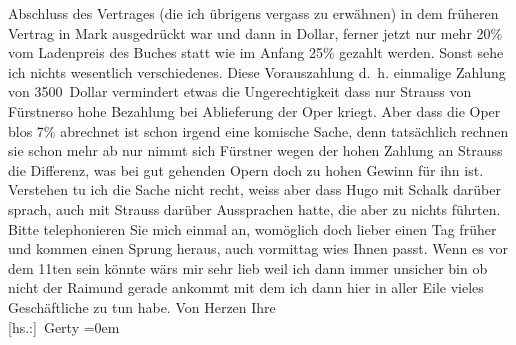 \begin{ledgroupsized}[t]{13cm}
               Abschluss des Vertrages (die ich übrigens vergass zu erwähnen) in dem früheren
               Vertrag in Mark ausgedrückt war und dann in Dollar, ferner jetzt nur mehr 20{\%} vom Ladenpreis des Buches statt wie im Anfang 25{\%} gezahlt werden. Sonst sehe ich nichts wesentlich
               verschiedenes. Diese Vorauszahlung d. h. einmalige Zahlung von 3500 Dollar vermindert
               etwas die Ungerechtigkeit dass nur Strauss von
                  Fürstnerso hohe Bezahlung bei Ablieferung der Oper kriegt.
               Aber dass die Oper blos 7{\%} abrechnet ist schon irgend eine
               komische Sache, denn tatsächlich rechnen sie schon mehr ab nur nimmt sich Fürstner wegen der hohen Zahlung an Strauss die Differenz, was bei gut gehenden
               Opern doch zu hohen Gewinn für ihn ist. Verstehen tu ich die Sache nicht recht, weiss
               aber dass Hugo mit Schalk darüber sprach, auch mit Strauss darüber Aussprachen hatte, die aber zu nichts
               führten.\pend
           \pstart
           Bitte telephonieren Sie mich einmal an, womöglich doch lieber einen Tag früher und
               kommen einen Sprung heraus, auch vormittag wies Ihnen passt.\pend
           \pstart
           Wenn es vor dem 11ten{ }sein könnte wärs mir sehr lieb weil ich dann immer
               unsicher bin ob nicht der Raimund gerade
               ankommt mit dem ich dann hier in aller Eile vieles Geschäftliche zu tun habe.\pend
           \pstart
           Von Herzen Ihre{\\[\baselineskip]}\spacefill\mbox{{[}hs.:{]} Gerty}\pend
           \leftskip=0em{}
         
         \endnumbering{}\end{ledgroupsized}  \newcommand{\dateiname}{L02544}\newcommand{\titel}{Gerty Hofmannsthal an Arthur Schnitzler, [5. 3. 1931]}\newcommand{\editorInnen}{Martin Anton Müller und Gerd-Hermann Susen}
      